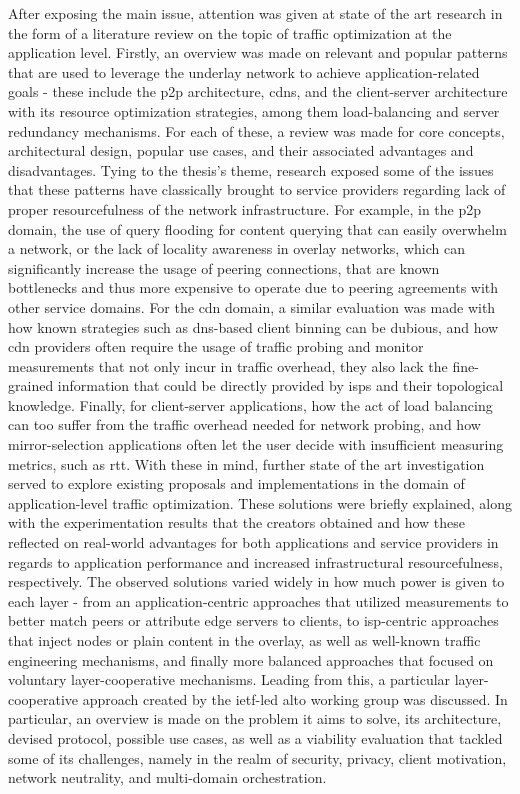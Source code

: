     After exposing the main issue, attention was given at state of the art research in the form of a literature review on the topic of traffic optimization at the application level.
    Firstly, an overview was made on relevant and popular patterns that are used to leverage the underlay network to achieve application-related goals - these include the \gls{p2p} architecture, \glspl{cdn}, and the client-server architecture with its resource optimization strategies, among them load-balancing and server redundancy mechanisms.
    For each of these, a review was made for core concepts, architectural design, popular use cases, and their associated advantages and disadvantages. Tying to the thesis's theme, research exposed some of the issues that these patterns have classically brought to service providers regarding lack of proper resourcefulness of the network infrastructure.
    For example, in the \gls{p2p} domain, the use of query flooding for content querying that can easily overwhelm a network, or the lack of locality awareness in overlay networks, which can significantly increase the usage of peering connections, that are known bottlenecks and thus more expensive to operate due to peering agreements with other service domains.
    For the \gls{cdn} domain, a similar evaluation was made with how known strategies such as \gls{dns}-based client binning can be dubious, and how \gls{cdn} providers often require the usage of traffic probing and monitor measurements that not only incur in traffic overhead, they also lack the fine-grained information that could be directly provided by \glspl{isp} and their topological knowledge. 
    Finally, for client-server applications, how the act of load balancing can too suffer from the traffic overhead needed for network probing, and how mirror-selection applications often let the user decide with insufficient measuring metrics, such as \gls{rtt}.
    With these in mind, further state of the art investigation served to explore existing proposals and implementations in the domain of application-level traffic
optimization. 
    These solutions were briefly explained, along with the experimentation results that the creators obtained and how these reflected on real-world advantages for both applications and service providers in regards to application performance and increased infrastructural resourcefulness, respectively.
    The observed solutions varied widely in how much power is given to each layer - from an application-centric approaches that utilized measurements to better match peers or attribute edge servers to clients, to \gls{isp}-centric approaches that inject nodes or plain content in the overlay, as well as well-known traffic engineering mechanisms, and finally more balanced approaches that focused on voluntary layer-cooperative mechanisms.
    Leading from this, a particular layer-cooperative approach created by the \gls{ietf}-led \gls{alto} working group was discussed.
    In particular, an overview is made on the problem it aims to solve, its architecture, devised protocol, possible use cases, as well as a viability evaluation that tackled some of its challenges, namely in the realm of security, privacy, client motivation, network neutrality, and multi-domain orchestration.

